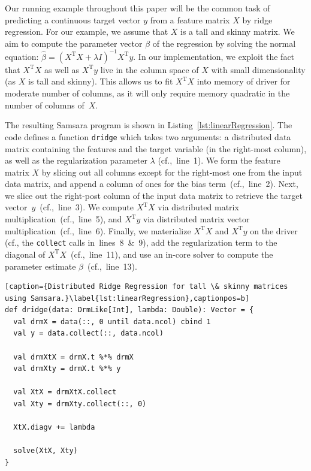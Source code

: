 \documentclass{article}
\begin{document}
Our running example throughout this paper will be the common task of predicting a continuous target vector $y$ from a feature matrix $X$ by ridge regression. For our example, we assume that $X$ is a tall and skinny matrix. We aim to compute the parameter vector $\beta$ of the regression by solving the normal equation: $\hat{\beta} = (X^\mathrm{T}X + \lambda I)^{-1} X^\mathrm{T}y$. In our implementation, we exploit the fact that $X^\mathrm{T} X$ as well as $X^\mathrm{T} y$ live in the column space of $X$ with small dimensionality (as $X$ is tall and skinny). This allows us to fit $X^\mathrm{T} X$ into memory of driver for moderate number of columns, as it will only require memory quadratic in the number of columns of~$X$.

The resulting Samsara program is shown in Listing~\ref{lst:linearRegression}. The code defines a function \texttt{dridge} which takes two arguments: a distributed data matrix containing the features and the target variable (in the right-most column), as well as the regularization parameter $\lambda$ (cf.,~line~1). We form the feature matrix $X$ by slicing out all columns except for the right-most one from the input data matrix, and append a column of ones for the bias term~(cf.,~line~2). Next, we slice out the right-post column of the input data matrix to retrieve the target vector~$y$~(cf.,~line~3). We compute $X^\mathrm{T} X$ via distributed matrix multiplication~(cf.,~line~5), and $X^\mathrm{T}y$ via distributed matrix vector multiplication~(cf.,~line~6). Finally, we materialize $X^\mathrm{T} X$  and $X^\mathrm{T} y$ on the driver (cf., the \texttt{collect} calls in~lines~8~\&~9), add the regularization term to the diagonal of $X^\mathrm{T} X$~(cf.,~line~11), and use an in-core solver to compute the parameter estimate $\beta$~(cf.,~line~13).

\begin{lstlisting}[caption={Distributed Ridge Regression for tall \& skinny matrices using Samsara.}\label{lst:linearRegression},captionpos=b] 
def dridge(data: DrmLike[Int], lambda: Double): Vector = {
  val drmX = data(::, 0 until data.ncol) cbind 1
  val y = data.collect(::, data.ncol)

  val drmXtX = drmX.t %*% drmX
  val drmXty = drmX.t %*% y

  val XtX = drmXtX.collect 
  val Xty = drmXty.collect(::, 0) 

  XtX.diagv += lambda

  solve(XtX, Xty)
}
\end{lstlisting}
\end{document}
